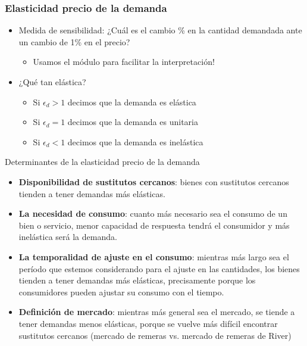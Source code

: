 \documentclass{beamer}
\begin{document}
\begin{frame}
\frametitle{Elasticidad precio de la demanda}
  \begin{itemize}
    \item Medida de sensibilidad: ¿Cuál es el cambio \% en la cantidad demandada ante un cambio de 1\% en el precio?
      \vspace{1mm}
    \begin{itemize}
        \item Usamos el módulo para facilitar la interpretación!   \vspace{2mm}
    \end{itemize}
    \item ¿Qué tan elástica?   \vspace{2mm}
    \begin{itemize}
      \item Si $\epsilon_d > 1$ decimos que la demanda es elástica   \vspace{1mm}
      \item Si $\epsilon_d = 1$ decimos que la demanda es unitaria   \vspace{1mm}
      \item Si $\epsilon_d < 1$ decimos que la demanda es inelástica   \vspace{1mm}
    \end{itemize}
  \end{itemize}
\end{frame}

\begin{frame}{Determinantes de la elasticidad precio de la demanda}
  \begin{itemize}
    \item \textbf{Disponibilidad de sustitutos cercanos}: bienes con sustitutos cercanos tienden a tener demandas más elásticas.
    \item \textbf{La necesidad de consumo}: cuanto más necesario sea el consumo de un bien o servicio, menor capacidad de respuesta tendrá el consumidor y más inelástica será la demanda.
    \item \textbf{La temporalidad de ajuste en el consumo}: mientras más largo sea el período que estemos considerando para el ajuste en las cantidades, los bienes tienden a tener demandas más elásticas, precisamente porque los consumidores pueden ajustar su consumo con el tiempo.
    \item \textbf{Definición de mercado}: mientras más general sea el mercado, se tiende a tener demandas menos elásticas, porque se vuelve más difícil encontrar sustitutos cercanos (mercado de remeras vs. mercado de remeras de River)
  \end{itemize}
\end{frame}
\end{document}
